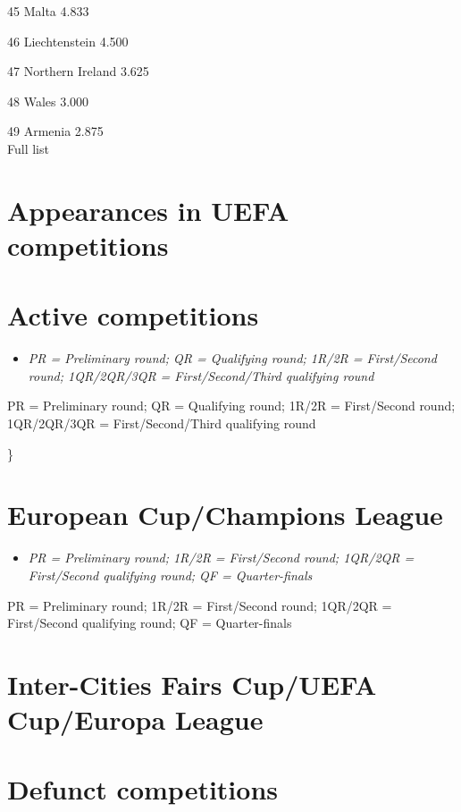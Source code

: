 45 Malta 4.833

46 Liechtenstein 4.500

47 Northern Ireland 3.625

48 Wales 3.000

49 Armenia 2.875\\
Full list

\section{Appearances in UEFA
competitions}\label{appearances-in-uefa-competitions}

\section{Active competitions}\label{active-competitions}

\begin{itemize}
\item
  \emph{PR = Preliminary round; QR = Qualifying round; 1R/2R =
  First/Second round; 1QR/2QR/3QR = First/Second/Third qualifying round}
\end{itemize}

PR = Preliminary round; QR = Qualifying round; 1R/2R = First/Second
round; 1QR/2QR/3QR = First/Second/Third qualifying round

\textbar{}\}

\section{European Cup/Champions
League}\label{european-cupchampions-league}

\begin{itemize}
\item
  \emph{PR = Preliminary round; 1R/2R = First/Second round; 1QR/2QR =
  First/Second qualifying round; QF = Quarter-finals}
\end{itemize}

PR = Preliminary round; 1R/2R = First/Second round; 1QR/2QR =
First/Second qualifying round; QF = Quarter-finals

\section{Inter-Cities Fairs Cup/UEFA Cup/Europa
League}\label{inter-cities-fairs-cupuefa-cupeuropa-league}

\section{Defunct competitions}\label{defunct-competitions}


